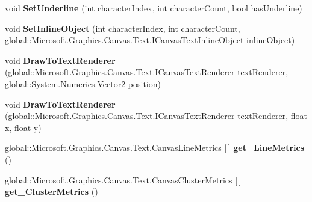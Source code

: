 \begin{DoxyCompactItemize}
\item 
\mbox{\label{interface_microsoft_1_1_graphics_1_1_canvas_1_1_text_1_1_i_canvas_text_layout_a629390d20f6e2f22860ca237e72881ee}} 
void {\bfseries Set\+Underline} (int character\+Index, int character\+Count, bool has\+Underline)
\item 
\mbox{\label{interface_microsoft_1_1_graphics_1_1_canvas_1_1_text_1_1_i_canvas_text_layout_a36f4e4337bca474c30dbc45e8e5271af}} 
void {\bfseries Set\+Inline\+Object} (int character\+Index, int character\+Count, global\+::\+Microsoft.\+Graphics.\+Canvas.\+Text.\+I\+Canvas\+Text\+Inline\+Object inline\+Object)
\item 
\mbox{\label{interface_microsoft_1_1_graphics_1_1_canvas_1_1_text_1_1_i_canvas_text_layout_ae1ee823236a004edbcb90267c853b058}} 
void {\bfseries Draw\+To\+Text\+Renderer} (global\+::\+Microsoft.\+Graphics.\+Canvas.\+Text.\+I\+Canvas\+Text\+Renderer text\+Renderer, global\+::\+System.\+Numerics.\+Vector2 position)
\item 
\mbox{\label{interface_microsoft_1_1_graphics_1_1_canvas_1_1_text_1_1_i_canvas_text_layout_a97cc5738dc8df87ea520f6446b3f5053}} 
void {\bfseries Draw\+To\+Text\+Renderer} (global\+::\+Microsoft.\+Graphics.\+Canvas.\+Text.\+I\+Canvas\+Text\+Renderer text\+Renderer, float x, float y)
\item 
\mbox{\label{interface_microsoft_1_1_graphics_1_1_canvas_1_1_text_1_1_i_canvas_text_layout_aed7ad1845a233070df02e428dca2f7c2}} 
global\+::\+Microsoft.\+Graphics.\+Canvas.\+Text.\+Canvas\+Line\+Metrics \mbox{[}$\,$\mbox{]} {\bfseries get\+\_\+\+Line\+Metrics} ()
\item 
\mbox{\label{interface_microsoft_1_1_graphics_1_1_canvas_1_1_text_1_1_i_canvas_text_layout_a5be8b44c03e366473263dacc72514c1f}} 
global\+::\+Microsoft.\+Graphics.\+Canvas.\+Text.\+Canvas\+Cluster\+Metrics \mbox{[}$\,$\mbox{]} {\bfseries get\+\_\+\+Cluster\+Metrics} ()

\end{DoxyCompactItemize}
